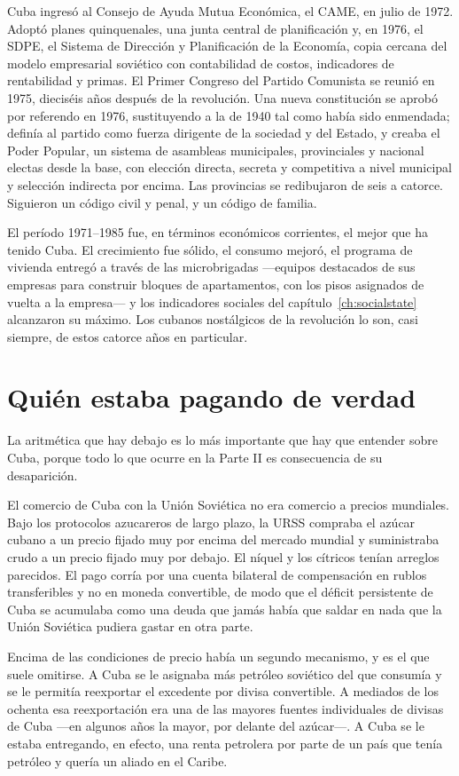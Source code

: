 Cuba ingresó al Consejo de Ayuda Mutua Económica, el CAME, en julio de 1972.
Adoptó planes quinquenales, una junta central de planificación y, en 1976, el
SDPE, el Sistema de Dirección y Planificación de la Economía, copia cercana del
modelo empresarial soviético con contabilidad de costos, indicadores de
rentabilidad y primas. El Primer Congreso del Partido Comunista se reunió en
1975, dieciséis años después de la revolución. Una nueva constitución se aprobó
por referendo en 1976, sustituyendo a la de 1940 tal como había sido enmendada;
definía al partido como fuerza dirigente de la sociedad y del Estado, y creaba el
Poder Popular, un sistema de asambleas municipales, provinciales y nacional
electas desde la base, con elección directa, secreta y competitiva a nivel
municipal y selección indirecta por encima. Las provincias se redibujaron de seis
a catorce. Siguieron un código civil y penal, y un código de familia.

El período 1971--1985 fue, en términos económicos corrientes, el mejor que ha
tenido Cuba. El crecimiento fue sólido, el consumo mejoró, el programa de
vivienda entregó a través de las microbrigadas ---equipos destacados de sus
empresas para construir bloques de apartamentos, con los pisos asignados de vuelta
a la empresa--- y los indicadores sociales del capítulo~\ref{ch:socialstate}
alcanzaron su máximo. Los cubanos nostálgicos de la revolución lo son, casi
siempre, de estos catorce años en particular.

\section{Quién estaba pagando de verdad}

La aritmética que hay debajo es lo más importante que hay que entender sobre
Cuba, porque todo lo que ocurre en la Parte II es consecuencia de su desaparición.

El comercio de Cuba con la Unión Soviética no era comercio a precios mundiales.
Bajo los protocolos azucareros de largo plazo, la URSS compraba el azúcar cubano
a un precio fijado muy por encima del mercado mundial y suministraba crudo a un
precio fijado muy por debajo. El níquel y los cítricos tenían arreglos parecidos.
El pago corría por una cuenta bilateral de compensación en rublos transferibles y
no en moneda convertible, de modo que el déficit persistente de Cuba se acumulaba
como una deuda que jamás había que saldar en nada que la Unión Soviética pudiera
gastar en otra parte.

Encima de las condiciones de precio había un segundo mecanismo, y es el que suele
omitirse. A Cuba se le asignaba más petróleo soviético del que consumía y se le
permitía reexportar el excedente por divisa convertible. A mediados de los ochenta
esa reexportación era una de las mayores fuentes individuales de divisas de Cuba
---en algunos años la mayor, por delante del azúcar---.\unv{} A Cuba se le estaba
entregando, en efecto, una renta petrolera por parte de un país que tenía petróleo
y quería un aliado en el Caribe.

